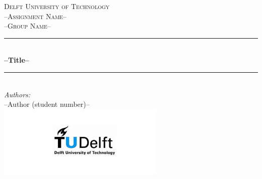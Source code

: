 \documentclass[a4paper]{article}
\makeatletter
\renewcommand \dotfill {\leavevmode \cleaders \hb@xt@ .66em{\hss .\hss }\hfill \kern \z@}
\makeatother
\begin{document}
\begin{titlepage}

\newcommand{\HRule}{\rule{\linewidth}{0.5mm}} 							%
\center 
 
\textsc{\LARGE Delft University of Technology}\\[1cm]

\textsc{\Large --Assignment Name--}\\[0.2cm]
\textsc{\large --Group Name--}\\[1cm] %
\HRule \\[0.8cm]
{ \huge \bfseries --Title--}\\[0.7cm]								%
\HRule \\[2cm]
\large
\center
\emph{Authors:}\\[0.5cm]
--Author (student number)--\\

\vfill
\includegraphics[width=0.6\textwidth]{Figures/TU_delft_logo.jpg}\\[1cm] 	%
\vfill 
\end{titlepage}


\newpage
{}


\newpage
{}


\newpage
\tableofcontents

\newpage

\makenomenclature
\renewcommand{\nomname}{List of Symbols}
\newcommand{\nomunit}[1]{%
\renewcommand{\nomentryend}{\dotfill#1}}
\printnomenclature[1.2cm]

\listoffigures
{}

\listoftables
{}

\newpage


\newpage


\newpage

\newpage



\newpage

\end{document}
